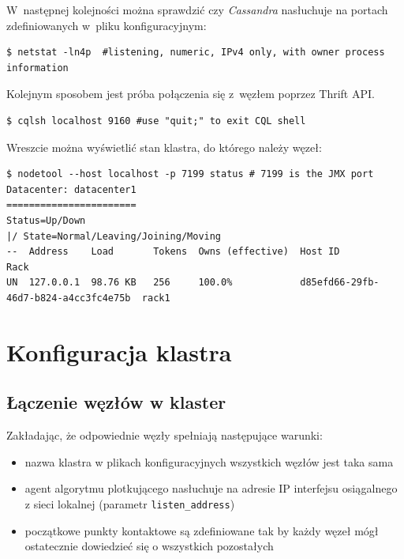 \documentclass{article} %
\begin{document}
W~następnej kolejności można sprawdzić czy \emph{Cassandra} nasłuchuje na portach zdefiniowanych w~pliku konfiguracyjnym:

\begin{lstlisting}[style=bash, caption={sprawdzanie na których portach nasłuchuje \emph{Cassandra}}]
$ netstat -ln4p  #listening, numeric, IPv4 only, with owner process information
\end{lstlisting}

Kolejnym sposobem jest próba połączenia się z~węzłem poprzez Thrift API.

\begin{lstlisting}[style=bash, caption={dostęp do \emph{Cassandry} przez \emph{Thrift API}.}]
$ cqlsh localhost 9160 #use "quit;" to exit CQL shell
\end{lstlisting}

Wreszcie można wyświetlić stan klastra, do którego należy węzeł:

\begin{lstlisting}[style=bash, caption={sprawdzanie stanu klastra}]
$ nodetool --host localhost -p 7199 status # 7199 is the JMX port
Datacenter: datacenter1
=======================
Status=Up/Down
|/ State=Normal/Leaving/Joining/Moving
--  Address    Load       Tokens  Owns (effective)  Host ID                               Rack
UN  127.0.0.1  98.76 KB   256     100.0%            d85efd66-29fb-46d7-b824-a4cc3fc4e75b  rack1
\end{lstlisting}

\section{Konfiguracja klastra}\label{sec:cluster}

\subsection{Łączenie węzłów w klaster}\label{subsec:cluster_connecting}

Zakładając, że odpowiednie węzły spełniają następujące warunki:

\begin{itemize}
\item nazwa klastra w plikach konfiguracyjnych wszystkich węzłów jest taka sama
\item agent algorytmu plotkującego nasłuchuje na adresie IP interfejsu osiągalnego z sieci lokalnej (parametr \texttt{listen\_address})
\item początkowe punkty kontaktowe są zdefiniowane tak by każdy węzeł mógł ostatecznie dowiedzieć się o wszystkich pozostałych
\end{itemize}
\end{document}
